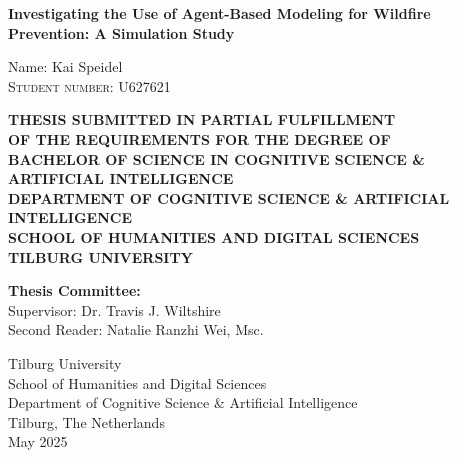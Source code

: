 \documentclass[twoside]{article}
\begin{document}
\begin{titlepage}
    \thispagestyle{empty}
    \begin{center}

        \vspace{2cm}
        
        {\LARGE\bfseries Investigating the Use of Agent-Based Modeling for Wildfire Prevention: A Simulation Study\par}
        
        \vspace{2cm}
        \large Name: Kai Speidel \\
        \textsc{Student number: U627621}

        \vspace{2cm}
        \small
        \textbf{THESIS SUBMITTED IN PARTIAL FULFILLMENT} \\
        \textbf{OF THE REQUIREMENTS FOR THE DEGREE OF} \\
        \textbf{BACHELOR OF SCIENCE IN COGNITIVE SCIENCE \& ARTIFICIAL INTELLIGENCE} \\
        \textbf{DEPARTMENT OF COGNITIVE SCIENCE \& ARTIFICIAL INTELLIGENCE} \\
        \textbf{SCHOOL OF HUMANITIES AND DIGITAL SCIENCES} \\
        \textbf{TILBURG UNIVERSITY}

        \vspace{2cm}

        \large\textbf{Thesis Committee:} \\
        \normalsize
        Supervisor: Dr. Travis J. Wiltshire \\
        Second Reader: Natalie Ranzhi Wei, Msc. 

        \vfill

        Tilburg University \\
        School of Humanities and Digital Sciences \\
        Department of Cognitive Science \& Artificial Intelligence \\
        Tilburg, The Netherlands \\
        May 2025
    \end{center}
\end{titlepage}
\setcounter{page}{1}

\pagestyle{fancy}
\fancyhf{} %
\fancyhead[RE]{\small\nouppercase{\rightmark}}
\end{document}
